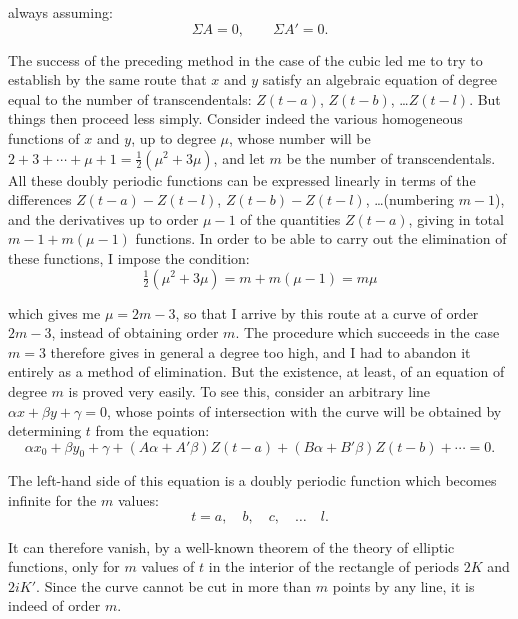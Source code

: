 \documentclass[12pt]{article}
\begin{document}
\noindent always assuming:
\begin{equation*}
\Sigma A = 0, \qquad \Sigma A' = 0.
\end{equation*}

\noindent The success of the preceding method in the case of the cubic led me to try to establish by the same route that $x$ and $y$ satisfy an algebraic equation of degree equal to the number of transcendentals: $Z(t-a)$, $Z(t-b)$, \ldots $Z(t-l)$. 
But things then proceed less simply. Consider indeed
the various homogeneous functions of $x$ and $y$, up to degree $\mu$, whose number will be $2+3+\cdots+\mu+1 = \frac{1}{2}(\mu^2+3\mu)$, and let $m$ be the number of transcendentals. 
All these doubly periodic functions can be expressed linearly in terms of the differences $Z(t-a)-Z(t-l)$, $Z(t-b)-Z(t-l)$, \ldots (numbering $m-1$), and the derivatives up to order $\mu-1$ of the quantities $Z(t-a)$, giving in total $m-1+m(\mu-1)$ functions. 
In order to be able to carry out the elimination of these functions, I impose the condition:
\begin{equation*}
\tfrac{1}{2}(\mu^2+3\mu) = m + m(\mu-1) = m\mu
\end{equation*}

\noindent which gives me $\mu = 2m-3$, so that I arrive by this route at a curve of order $2m-3$, instead of obtaining order $m$. The procedure which succeeds in the case $m=3$ therefore gives in general a degree too high, and I had to abandon it entirely as a method of elimination. But the existence, at least, of an equation of degree $m$ is proved very easily. To see this, consider an arbitrary line $\alpha x + \beta y + \gamma = 0$, whose points of intersection with the curve will be obtained by determining $t$ from the equation:
\begin{equation*}
\alpha x_0 + \beta y_0 + \gamma + (A\alpha + A'\beta)Z(t-a) + (B\alpha + B'\beta)Z(t-b) + \cdots = 0.
\end{equation*}

\noindent The left-hand side of this equation is a doubly periodic function which becomes infinite for the $m$ values:
\begin{equation*}
t = a, \quad b, \quad c, \quad \ldots \quad l.
\end{equation*}

\noindent It can therefore vanish, by a well-known theorem of the theory of elliptic functions, only for $m$ values of $t$ in the interior of the rectangle of periods $2K$ and $2iK'$. Since the curve cannot be cut in more than $m$ points by any line, it is indeed of order $m$.
\end{document}
